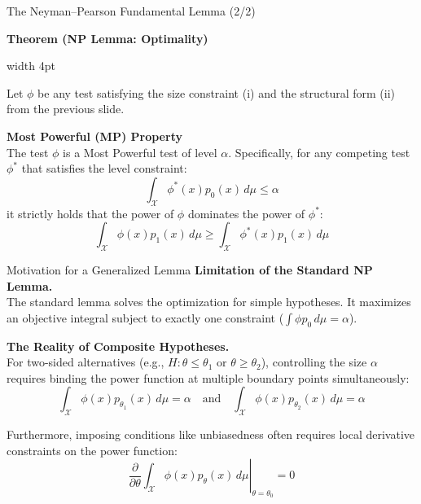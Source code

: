 \documentclass[10pt, aspectratio=169, xcolor=dvipsnames]{beamer}
\newcommand{\lead}[1]{{\color{UniBlue}\bfseries #1}}
\begin{document}
\begin{frame}{The Neyman--Pearson Fundamental Lemma (2/2)}
    
    \lead{Theorem (NP Lemma: Optimality)}\\
    \vspace{0.2cm}

    \noindent
    {\color{Teal}\vrule width 4pt}%
    \hspace{10pt}%
    \begin{minipage}{\dimexpr\textwidth-14pt\relax}
        \color{Slate}
        Let $\phi$ be any test satisfying the size constraint (i) and the structural form (ii) from the previous slide.
        
        \vspace{0.6cm}
        \lead{Most Powerful (MP) Property}\\
        \vspace{0.1cm}
        The test $\phi$ is a Most Powerful test of level $\alpha$. Specifically, for any competing test $\phi^*$ that satisfies the level constraint:
        \[ \int_{\mathcal{X}} \phi^*(x) p_0(x) \, d\mu \le \alpha \]
        it strictly holds that the power of $\phi$ dominates the power of $\phi^*$:
        \[ \int_{\mathcal{X}} \phi(x) p_1(x) \, d\mu \ge \int_{\mathcal{X}} \phi^*(x) p_1(x) \, d\mu \]
    \end{minipage}
\end{frame}

\begin{frame}{Motivation for a Generalized Lemma}
    \lead{Limitation of the Standard NP Lemma.}\\
    The standard lemma solves the optimization for simple hypotheses. It maximizes an objective integral subject to \alert{exactly one} constraint ($\int \phi p_0 \, d\mu = \alpha$).

    \vspace{0.3cm}
    \lead{The Reality of Composite Hypotheses.}\\
    For two-sided alternatives (e.g., $H: \theta \le \theta_1 \text{ or } \theta \ge \theta_2$), controlling the size $\alpha$ requires binding the power function at multiple boundary points simultaneously:
    \[ \int_{\mathcal{X}} \phi(x) p_{\theta_1}(x) \, d\mu = \alpha \quad \text{and} \quad \int_{\mathcal{X}} \phi(x) p_{\theta_2}(x) \, d\mu = \alpha \]

    \vspace{0.1cm}
    Furthermore, imposing conditions like unbiasedness often requires local derivative constraints on the power function:
    \[ \left. \frac{\partial}{\partial \theta} \int_{\mathcal{X}} \phi(x) p_\theta(x) \, d\mu \right|_{\theta=\theta_0} = 0 \]
\end{frame}
\end{document}

